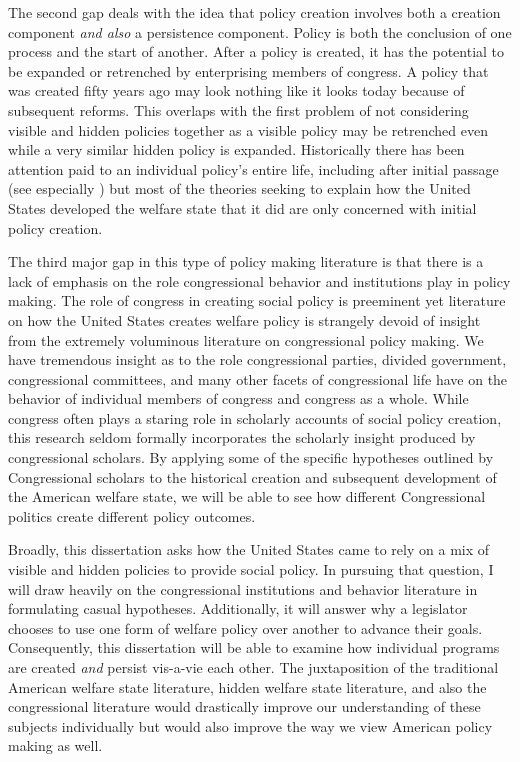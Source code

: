 \documentclass[12pt]{article}
\begin{document}
The second gap deals with the idea that policy creation involves both a creation component \emph{and also} a persistence component. Policy is both the conclusion of one process and the start of another. After a policy is created, it has the potential to be expanded or retrenched by enterprising members of congress. A policy that was created fifty years ago may look nothing like it looks today because of subsequent reforms. This overlaps with the first problem of not considering visible and hidden policies together as a visible policy may be retrenched even while a very similar hidden policy is expanded. Historically there has been attention paid to an individual policy's entire life, including after initial passage (see especially \cite{derthick1979, hacker2002}) but most of the theories seeking to explain how the United States developed the welfare state that it did are only concerned with initial policy creation. 

The third major gap in this type of policy making literature is that there is a lack of emphasis on the role congressional behavior and institutions play in policy making. The role of congress in creating social policy is preeminent yet literature on how the United States creates welfare policy is strangely devoid of insight from the extremely voluminous literature on congressional policy making. We have tremendous insight as to the role congressional parties, divided government, congressional committees, and many other facets of congressional life have on the behavior of individual members of congress and congress as a whole. While congress often plays a staring role in scholarly accounts of social policy creation, this research seldom formally incorporates the scholarly insight produced by congressional scholars. By applying some of the specific hypotheses outlined by Congressional scholars to the historical creation and subsequent development of the American welfare state, we will be able to see how different Congressional politics create different policy outcomes.

Broadly, this dissertation asks how the United States came to rely on a mix of visible and hidden policies to provide social policy. In pursuing that question, I will draw heavily on the congressional institutions and behavior literature in formulating casual hypotheses. Additionally, it will answer why a legislator chooses to use one form of welfare policy over another to advance their goals. Consequently, this dissertation will be able to examine how individual programs are created \emph{and} persist vis-a-vie each other. The juxtaposition of the traditional American welfare state literature, hidden welfare state literature, and also the congressional literature would drastically improve our understanding of these subjects individually but would also improve the way we view American policy making as well.  
\end{document}
